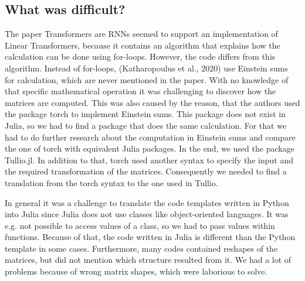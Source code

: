 \documentclass[DIV=13,fontsize=11pt]{scrartcl}
\begin{document}



\subsection{What was difficult?}
The paper Transformers are RNNs seemed to support an implementation of Linear Transformers, because it contains an algorithm that explains how the calculation can be done using for-loops. However, the code differs from this algorithm. Instead of for-loops, (Katharopoulus et al., 2020) use Einstein sums for calculation, which are never mentioned in the paper. With no knowledge of that specific mathematical operation it was challenging to discover how the matrices are computed. This was also caused by the reason, that the authors used the package torch to implement Einstein sums. This package does not exist in Julia, so we had to find a package that does the same calculation. For that we had to do further research about the computation in Einstein sums and compare the one of torch with equivalent Julia packages. In the end, we used the package Tullio.jl. In addition to that, torch used another syntax to specify the input and the required transformation of the matrices. Consequently we needed to find a translation from the torch syntax to the one used in Tullio.

In general it was a challenge to translate the code templates written in Python into Julia since Julia does not use classes like object-oriented languages. It was e.g. not possible to access values of a class, so we had to pass values within functions. Because of that, the code written in Julia is different than the Python template in some cases. Furthermore, many codes contained reshapes of the matrices, but did not mention which structure resulted from it. We had a lot of problems because of wrong matrix shapes, which were laborious to solve.
\end{document}
